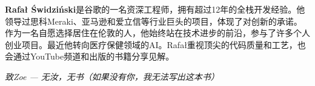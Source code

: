 \textbf{Rafał Świdziński}是谷歌的一名资深工程师，拥有超过12年的全栈开发经验。他领导过思科Meraki、亚马逊和爱立信等行业巨头的项目，体现了对创新的承诺。作为一名自愿选择居住在伦敦的人，他始终站在技术进步的前沿，参与了许多个人创业项目。最近他转向医疗保健领域的AI。Rafał重视顶尖的代码质量和工艺，也会通过YouTube频道和出版的书籍分享见解。

\textit{致Zoe --- 无汝，无书（如果没有你，我无法写出这本书）}




